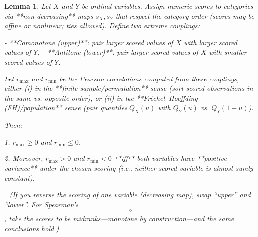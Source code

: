 \documentclass[
  12pt,
]{article}
\theoremstyle{plain}
\newtheorem{lemma}[theorem]{Lemma}
\theoremstyle{definition}
\theoremstyle{remark}
\begin{document}
\label{prop-max-product}
\begin{lemma}

Let $X$ and $Y$ be ordinal variables. Assign numeric scores to categories via **non-decreasing** maps $s_X, s_Y$ that respect the category order (scores may be affine or nonlinear; ties allowed). Define two extreme couplings:

- **Comonotone (upper)**: pair larger scored values of $X$ with larger scored values of $Y$.
- **Antitone (lower)**: pair larger scored values of $X$ with smaller scored values of $Y$.
    

Let $r_{\max}$ and $r_{\min}$ be the Pearson correlations computed from these couplings, either (i) in the **finite-sample/permutation** sense (sort scored observations in the same vs. opposite order), or (ii) in the **Fréchet–Hoeffding (FH)/population** sense (pair quantiles $Q_X(u)$ with $Q_Y(u)$ vs. $Q_Y(1-u)$).

Then:

1. $r_{\max}\ge 0$ and $r_{\min}\le 0$.
    
2. Moreover, $r_{\max}>0$ and $r_{\min}<0$ **iff** both variables have **positive variance** under the chosen scoring (i.e., neither scored variable is almost surely constant).
    

_(If you reverse the scoring of one variable (decreasing map), swap “upper” and “lower”. For Spearman’s $$\rho$$, take the scores to be midranks—monotone by construction—and the same conclusions hold.)_
\end{lemma}
\end{document}
